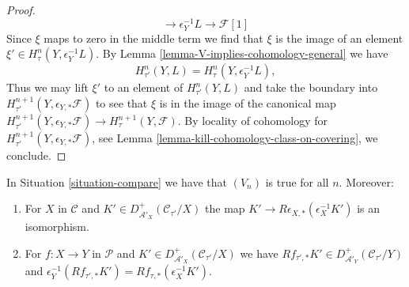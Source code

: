 \begin{proof}
$$\to \epsilon_Y^{-1}L \to \mathcal{F}[1]
$$
Since $\xi$ maps to zero in the middle term we find
that $\xi$ is the image of an element
$\xi' \in H^n_\tau(Y, \epsilon_Y^{-1}L)$.
By Lemma \ref{lemma-V-implies-cohomology-general} we have
$$
H^n_{\tau'}(Y, L) = H^n_\tau(Y, \epsilon_Y^{-1}L),
$$
Thus we may lift $\xi'$ to an element of $H^n_{\tau'}(Y, L)$
and take the boundary into
$H^{n + 1}_{\tau'}(Y, \epsilon_{Y, *}\mathcal{F})$
to see that $\xi$ is in the image of the canonical map
$H^{n + 1}_{\tau'}(Y, \epsilon_{Y, *}\mathcal{F}) \to
H^{n + 1}_\tau(Y, \mathcal{F})$.
By locality of cohomology for
$H^{n + 1}_{\tau'}(Y,\epsilon_{Y, *}\mathcal{F})$, see
Lemma \ref{lemma-kill-cohomology-class-on-covering},
we conclude.
\end{proof}

\begin{lemma}
\label{lemma-V-C-all-n-general}
In Situation \ref{situation-compare} we have that
$(V_n)$ is true for all $n$. Moreover:
\begin{enumerate}
\item For $X$ in $\mathcal{C}$ and
$K' \in D^+_{\mathcal{A}'_X}(\mathcal{C}_{\tau'}/X)$ the map
$K' \to R\epsilon_{X, *}(\epsilon_X^{-1}K')$ is an isomorphism.
\item For $f : X \to Y$ in $\mathcal{P}$ and
$K' \in D^+_{\mathcal{A}'_X}(\mathcal{C}_{\tau'}/X)$ we have
$Rf_{\tau', *}K' \in D^+_{\mathcal{A}'_Y}(\mathcal{C}_{\tau'}/Y)$ and
$\epsilon_Y^{-1}(Rf_{\tau', *}K') = Rf_{\tau, *}(\epsilon_X^{-1}K')$.
\end{enumerate}
\end{lemma}

